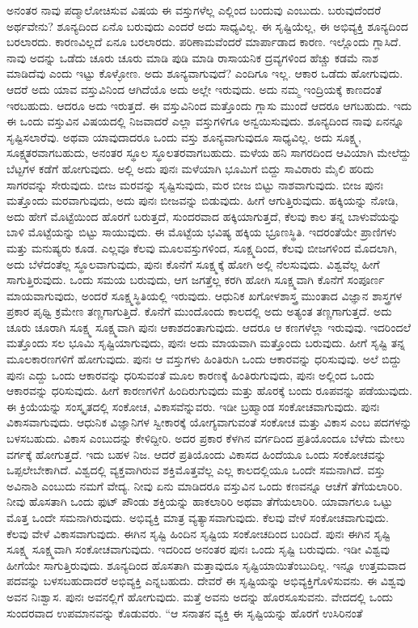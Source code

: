 ಅನಂತರ ನಾವು ಪದ್ಮಾಲೋಚಿಸುವ ವಿಷಯ ಈ ವಸ್ತುಗಳೆಲ್ಲ ಎಲ್ಲಿಂದ ಬಂದುವು ಎಂಬುದು. ಬರುವುದೆಂದರೆ ಅರ್ಥವೇನು? ಶೂನ್ಯದಿಂದ ಏನೊ ಬರುವುದು ಎಂದರೆ ಅದು ಸಾಧ್ಯವಿಲ್ಲ. ಈ ಸೃಷ್ಟಿಯೆಲ್ಲ, ಈ ಅಭಿವ್ಯಕ್ತಿ ಶೂನ್ಯದಿಂದ ಬರಲಾರದು. ಕಾರಣವಿಲ್ಲದೆ ಏನೂ ಬರಲಾರದು. ಪರಿಣಾಮವೆಂದರೆ ಮಾರ್ಪಾಡಾದ ಕಾರಣ. ಇಲ್ಲೊಂದು ಗ್ಲಾಸಿದೆ. ನಾವು ಅದನ್ನು ಒಡೆದು ಚೂರು ಚೂರು ಮಾಡಿ ಪುಡಿ ಮಾಡಿ ರಾಸಾಯನಿಕ ದ್ರವ್ಯಗಳಿಂದ ಹೆಚ್ಚು ಕಡಮೆ ನಾಶ ಮಾಡಿದೆವು ಎಂದು ಇಟ್ಟು ಕೊಳ್ಳೋಣ. ಅದು ಶೂನ್ಯವಾಗುವುದೆ? ಎಂದಿಗೂ ಇಲ್ಲ. ಆಕಾರ ಒಡೆದು ಹೋಗುವುದು. ಆದರೆ ಅದು ಯಾವ ವಸ್ತುವಿನಿಂದ ಆಗಿದೆಯೊ ಅದು ಅಲ್ಲೇ ಇರುವುದು. ಅದು ನಮ್ಮ ಇಂದ್ರಿಯಕ್ಕೆ ಕಾಣದಂತೆ ಇರಬಹುದು. ಆದರೂ ಅದು ಇರುತ್ತದೆ. ಈ ವಸ್ತುವಿನಿಂದ ಮತ್ತೊಂದು ಗ್ಲಾಸು ಮುಂದೆ ಆದರೂ ಆಗಬಹುದು. ಇದು ಈ ಒಂದು ವಸ್ತುವಿನ ವಿಷಯದಲ್ಲಿ ನಿಜವಾದರೆ ಎಲ್ಲಾ ವಸ್ತುಗಳಿಗೂ ಅನ್ವಯಿಸುವುದು. ಶೂನ್ಯದಿಂದ ನಾವು ಏನನ್ನೂ ಸೃಷ್ಟಿಸಲಾರೆವು. ಅಥವಾ ಯಾವುದಾದರೂ ಒಂದು ವಸ್ತು ಶೂನ್ಯವಾಗುವುದೂ ಸಾಧ್ಯವಿಲ್ಲ. ಅದು ಸೂಕ್ಷ್ಮ, ಸೂಕ್ಷ್ಮತರವಾಗಬಹುದು, ಅನಂತರ ಸ್ಥೂಲ ಸ್ಥೂಲತರವಾಗಬಹುದು. ಮಳೆಯ ಹನಿ ಸಾಗರದಿಂದ ಆವಿಯಾಗಿ ಮೇಲೆದ್ದು ಬೆಟ್ಟಗಳ ಕಡೆಗೆ ಹೋಗುವುದು. ಅಲ್ಲಿ ಅದು ಪುನಃ ಮಳೆಯಾಗಿ ಭೂಮಿಗೆ ಬಿದ್ದು ಸಾವಿರಾರು ಮೈಲಿ ಹರಿದು ಸಾಗರವನ್ನು ಸೇರುವುದು. ಬೀಜ ಮರವನ್ನು ಸೃಷ್ಟಿಸುವುದು, ಮರ ಬೀಜ ಬಿಟ್ಟು ನಾಶವಾಗುವುದು. ಬೀಜ ಪುನಃ ಮತ್ತೊಂದು ಮರವಾಗುವುದು, ಅದು ಪುನಃ ಬೀಜವನ್ನು ಬಿಡುವುದು. ಹೀಗೆ ಆಗುತ್ತಿರುವುದು. ಹಕ್ಕಿಯನ್ನು ನೋಡಿ, ಅದು ಹೇಗೆ ಮೊಟ್ಟೆಯಿಂದ ಹೊರಗೆ ಬರುತ್ತದೆ, ಸುಂದರವಾದ ಹಕ್ಕಿಯಾಗುತ್ತದೆ, ಕೆಲವು ಕಾಲ ತನ್ನ ಬಾಳುವೆಯನ್ನು ಬಾಳಿ ಮೊಟ್ಟೆಯನ್ನು ಬಿಟ್ಟು ಸಾಯುವುದು. ಈ ಮೊಟ್ಟೆಯ ಭವಿಷ್ಯ ಹಕ್ಕಿಯ ಭ್ರೂಣಸ್ಥಿತಿ. ಇದರಂತೆಯೇ ಪ್ರಾಣಿಗಳು ಮತ್ತು ಮನುಷ್ಯರು ಕೂಡ. ಎಲ್ಲವೂ ಕೆಲವು ಮೂಲವಸ್ತುಗಳಿಂದ, ಸೂಕ್ಷ್ಮದಿಂದ, ಕೆಲವು ಬೀಜಗಳಿಂದ ಮೊದಲಾಗಿ, ಅದು ಬೆಳೆದಂತೆಲ್ಲ ಸ್ಥೂಲವಾಗುವುದು, ಪುನಃ ಕೊನೆಗೆ ಸೂಕ್ಷ್ಮಕ್ಕೆ ಹೋಗಿ ಅಲ್ಲಿ ನೆಲಸುವುದು. ವಿಶ್ವವೆಲ್ಲ ಹೀಗೆ ಸಾಗುತ್ತಿರುವುದು. ಒಂದು ಸಮಯ ಬರುವುದು, ಆಗ ಜಗತ್ತೆಲ್ಲ ಕರಗಿ ಹೋಗಿ ಸೂಕ್ಷ್ಮವಾಗಿ ಕೊನೆಗೆ ಸಂಪೂರ್ಣ ಮಾಯವಾಗುವುದು, ಅಂದರೆ ಸೂಕ್ಷ್ಮಸ್ಥಿತಿಯಲ್ಲಿ ಇರುವುದು. ಆಧುನಿಕ ಖಗೋಳಶಾಸ್ತ್ರ ಮುಂತಾದ ವಿಜ್ಞಾನ ಶಾಸ್ತ್ರಗಳ ಪ್ರಕಾರ ಪೃಥ್ವಿ ಕ್ರಮೇಣ ತಣ್ಣಗಾಗುತ್ತಿದೆ. ಕೊನೆಗೆ ಮುಂದೊಂದು ಕಾಲದಲ್ಲಿ ಅದು ಅತ್ಯಂತ ತಣ್ಣಗಾಗುತ್ತದೆ. ಅದು ಚೂರು ಚೂರಾಗಿ ಸೂಕ್ಷ್ಮ ಸೂಕ್ಷ್ಮವಾಗಿ ಪುನಃ ಆಕಾಶದಂತಾಗುವುದು. ಆದರೂ ಆ ಕಣಗಳೆಲ್ಲಾ ಇರುವುವು. ಇದರಿಂದಲೆ ಮತ್ತೊಂದು ಸಲ ಭೂಮಿ ಸೃಷ್ಟಿಯಾಗುವುದು, ಪುನಃ ಅದು ಮಾಯವಾಗಿ ಮತ್ತೊಂದು ಬರುವುದು. ಹೀಗೆ ಸೃಷ್ಟಿ ತನ್ನ ಮೂಲಕಾರಣಗಳಿಗೆ ಹೋಗುವುದು. ಪುನಃ ಆ ವಸ್ತುಗಳು ಹಿಂತಿರುಗಿ ಒಂದು ಆಕಾರವನ್ನು ಧರಿಸುವುವು. ಅಲೆ ಬಿದ್ದು ಪುನಃ ಎದ್ದು ಒಂದು ಆಕಾರವನ್ನು ಧರಿಸುವಂತೆ ಮೂಲ ಕಾರಣಕ್ಕೆ ಹಿಂತಿರುಗುವುದು, ಪುನಃ ಅಲ್ಲಿಂದ ಒಂದು ಆಕಾರವನ್ನು ಧರಿಸುವುದು. ಹೀಗೆ ಕಾರಣಗಳಿಗೆ ಹಿಂದಿರುಗುವುದು ಮತ್ತು ಹೊರಕ್ಕೆ ಬಂದು ರೂಪವನ್ನು ಪಡೆಯುವುದು. ಈ ಕ್ರಿಯೆಯನ್ನು ಸಂಸ್ಕೃತದಲ್ಲಿ ಸಂಕೋಚ, ವಿಕಾಸವೆನ್ನುವರು. ಇಡೀ ಬ್ರಹ್ಮಾಂಡ ಸಂಕೋಚವಾಗುವುದು. ಪುನಃ ವಿಕಾಸವಾಗುವುದು. ಆಧುನಿಕ ವಿಜ್ಞಾನಿಗಳ ಸ್ವೀಕಾರಕ್ಕೆ ಯೋಗ್ಯವಾಗುವಂತೆ ಸಂಕೋಚ ಮತ್ತು ವಿಕಾಸ ಎಂಬ ಪದಗಳನ್ನು ಬಳಸಬಹುದು. ವಿಕಾಸ ಎಂಬುದನ್ನು ಕೇಳಿದ್ದೀರಿ. ಅದರ ಪ್ರಕಾರ ಕೆಳಗಿನ ವರ್ಗದಿಂದ ಪ್ರತಿಯೊಂದೂ ಬೆಳೆದು ಮೇಲು ವರ್ಗಕ್ಕೆ ಹೋಗುತ್ತದೆ. ಇದು ಬಹಳ ನಿಜ. ಆದರೆ ಪ್ರತಿಯೊಂದು ವಿಕಾಸದ ಹಿಂದೆಯೂ ಒಂದು ಸಂಕೋಚವನ್ನು ಒಪ್ಪಲೇಬೇಕಾಗಿದೆ. ವಿಶ್ವದಲ್ಲಿ ವ್ಯಕ್ತವಾಗಿರುವ ಶಕ್ತಿಮೊತ್ತವೆಲ್ಲ ಎಲ್ಲ ಕಾಲದಲ್ಲಿಯೂ ಒಂದೇ ಸಮನಾಗಿದೆ. ವಸ್ತು ಅವಿನಾಶಿ ಎಂಬುದು ನಮಗೆ ವೇದ್ಯ. ನೀವು ಏನು ಮಾಡಿದರೂ ವಸ್ತುವಿನ ಒಂದು ಕಣವನ್ನೂ ಆಚೆಗೆ ತೆಗೆಯಲಾರಿರಿ. ನೀವು ಹೊಸತಾಗಿ ಒಂದು ಫುಟ್ ಪೌಂಡು ಶಕ್ತಿಯನ್ನು ಹಾಕಲಾರಿರಿ ಅಥವಾ ತೆಗೆಯಲಾರಿರಿ. ಯಾವಾಗಲೂ ಒಟ್ಟು ಮೊತ್ತ ಒಂದೇ ಸಮನಾಗಿರುವುದು. ಅಭಿವ್ಯಕ್ತಿ ಮಾತ್ರ ವ್ಯತ್ಯಾಸವಾಗುವುದು. ಕೆಲವು ವೇಳೆ ಸಂಕೋಚವಾಗುವುದು. ಕೆಲವು ವೇಳೆ ವಿಕಾಸವಾಗುವುದು. ಈಗಿನ ಸೃಷ್ಟಿ ಹಿಂದಿನ ಸೃಷ್ಟಿಯ ಸಂಕೋಚದಿಂದ ಬಂದಿದೆ. ಪುನಃ ಈಗಿನ ಸೃಷ್ಟಿ ಸೂಕ್ಷ್ಮ ಸೂಕ್ಷ್ಮವಾಗಿ ಸಂಕೋಚವಾಗುವುದು. ಇದರಿಂದ ಅನಂತರ ಪುನಃ ಒಂದು ಸೃಷ್ಟಿ ಬರುವುದು. ಇಡೀ ವಿಶ್ವವು ಹೀಗೆಯೇ ಸಾಗುತ್ತಿರುವುದು. ಶೂನ್ಯದಿಂದ ಹೊಸತಾಗಿ ಮತ್ತಾವುದೂ ಸೃಷ್ಟಿಯಾಯಿತೆಂಬುದಿಲ್ಲ. ಇನ್ನೂ ಉತ್ತಮವಾದ ಪದವನ್ನು ಬಳಸಬಹುದಾದರೆ ಅಭಿವ್ಯಕ್ತಿ ಎನ್ನಬಹುದು. ದೇವರೆ ಈ ಸೃಷ್ಟಿಯನ್ನು ಅಭಿವ್ಯಕ್ತಿಗೊಳಿಸುವನು. ಈ ವಿಶ್ವವು ಅವನ ನಿಃಶ್ವಾಸ. ಪುನಃ ಅವನಲ್ಲಿಗೆ ಹೋಗುವುದು. ಮತ್ತೆ ಅವನು ಅದನ್ನು ಹೊರಸೂಸುವನು. ವೇದದಲ್ಲಿ ಒಂದು ಸುಂದರವಾದ ಉಪಮಾನವನ್ನು ಕೊಡುವರು. ``ಆ ಸನಾತನ ವ್ಯಕ್ತಿ ಈ ಸೃಷ್ಟಿಯನ್ನು ಹೊರಗೆ ಉಸಿರಿನಂತೆ 